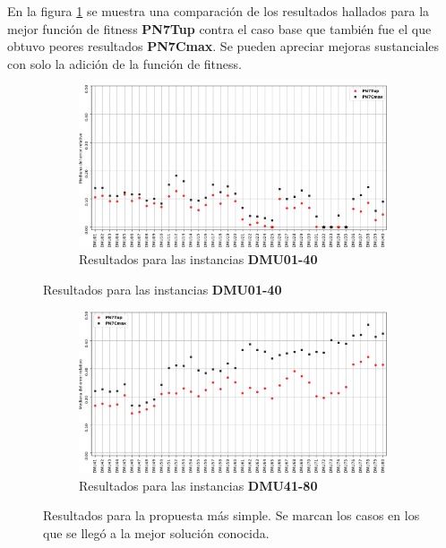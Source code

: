 En la figura \ref{fig:PN7CmaxvsPN7Tup} se muestra una comparación de los resultados hallados para la mejor función de fitness \textbf{PN7Tup} contra el caso base que también fue el que obtuvo peores resultados \textbf{PN7Cmax}. Se pueden apreciar mejoras sustanciales con solo la adición de la función de fitness.
\begin{figure}[H]
    \begin{subfigure}{\textwidth}
        \centering
        \includegraphics[scale=.65]{Imagenes/PN7CmaxvsPN7Tup_1.png}
        \caption{Resultados para las instancias \textbf{DMU01-40}}
    \end{subfigure}
\end{figure}
\begin{figure}[H]\ContinuedFloat
    \begin{subfigure}{\textwidth}
        \centering
        \includegraphics[scale=.65]{Imagenes/PN7CmaxvsPN7Tup_2.png}
        \caption{Resultados para las instancias \textbf{DMU41-80}}
    \end{subfigure}
    \caption{Resultados para la propuesta más simple. Se marcan los casos en los que se llegó a la mejor solución conocida.}
    \label{fig:PN7CmaxvsPN7Tup}
\end{figure}


